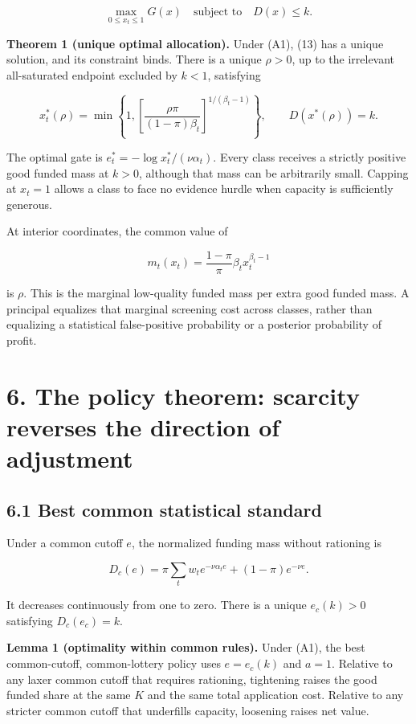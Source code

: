 \documentclass[
  11pt,
]{article}
\begin{document}
\[\max_{0\leq x_t\leq1}G(x)
\quad\text{subject to}\quad D(x)\leq k. \tag{13}\]

\textbf{Theorem 1 (unique optimal allocation).} Under (A1), (13) has a
unique solution, and its constraint binds. There is a unique \(\rho>0\),
up to the irrelevant all-saturated endpoint excluded by \(k<1\),
satisfying

\[x_t^*(\rho)=\min\left\{1,
\left[\frac{\rho\pi}{(1-\pi)\beta_t}\right]^{1/(\beta_t-1)}\right\},
\qquad D(x^*(\rho))=k. \tag{14}\]

The optimal gate is \(e_t^*=-\log x_t^*/(\nu\alpha_t)\). Every class
receives a strictly positive good funded mass at \(k>0\), although that
mass can be arbitrarily small. Capping at \(x_t=1\) allows a class to
face no evidence hurdle when capacity is sufficiently generous.

At interior coordinates, the common value of

\[m_t(x_t)=\frac{1-\pi}{\pi}\beta_t x_t^{\beta_t-1} \tag{15}\]

is \(\rho\). This is the marginal low-quality funded mass per extra good
funded mass. A principal equalizes that marginal screening cost across
classes, rather than equalizing a statistical false-positive probability
or a posterior probability of profit.

\section{6. The policy theorem: scarcity reverses the direction of
adjustment}\label{the-policy-theorem-scarcity-reverses-the-direction-of-adjustment}

\subsection{6.1 Best common statistical
standard}\label{best-common-statistical-standard}

Under a common cutoff \(e\), the normalized funding mass without
rationing is

\[D_c(e)=\pi\sum_t w_t e^{-\nu\alpha_t e}
+(1-\pi)e^{-\nu e}. \tag{16}\]

It decreases continuously from one to zero. There is a unique
\(e_c(k)>0\) satisfying \(D_c(e_c)=k\).

\textbf{Lemma 1 (optimality within common rules).} Under (A1), the best
common-cutoff, common-lottery policy uses \(e=e_c(k)\) and \(a=1\).
Relative to any laxer common cutoff that requires rationing, tightening
raises the good funded share at the same \(K\) and the same total
application cost. Relative to any stricter common cutoff that underfills
capacity, loosening raises net value.
\end{document}
